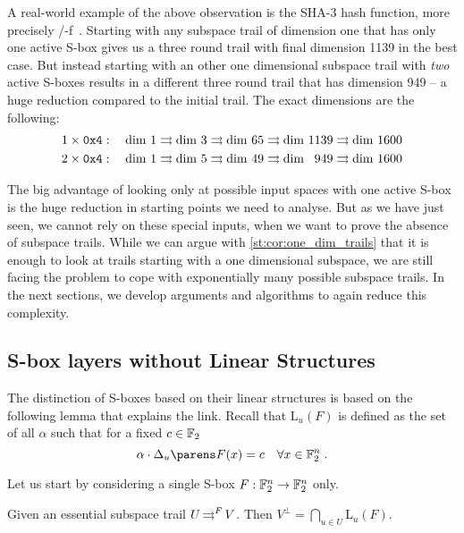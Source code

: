 \begin{example}
A real-world example of the above observation is the SHA-3 hash function, more precisely \keccak/-f~\cite{keccak,FIPS:SHA3}.
Starting with any subspace trail of dimension one that has only one active S-box gives us a three round trail with final dimension 1139 in the best case.
But instead starting with an other one dimensional subspace trail with \emph{two} active S-boxes results in a different three round trail that has dimension 949 -- a huge reduction compared to the initial trail.
The exact dimensions are the following:
\begin{align*}
    1\times \mathtt{0x4} &:\quad \mathrm{dim}\ 1 \rightrightarrows \mathrm{dim}\ 3 \rightrightarrows \mathrm{dim}\ 65 \rightrightarrows \mathrm{dim}\            1139 \rightrightarrows \mathrm{dim}\ 1600 \\
    2\times \mathtt{0x4} &:\quad \mathrm{dim}\ 1 \rightrightarrows \mathrm{dim}\ 5 \rightrightarrows \mathrm{dim}\ 49 \rightrightarrows \mathrm{dim}\ \hphantom{0}949 \rightrightarrows \mathrm{dim}\ 1600
\end{align*}
\end{example}

The big advantage of looking only at possible input spaces with one active S-box is the huge reduction in starting points we need to analyse.
But as we have just seen, we cannot rely on these special inputs, when we want to prove the absence of subspace trails.
While we can argue with \cref{st:cor:one_dim_trails} that it is enough to look at trails starting with a one dimensional subspace, we are still facing the problem to cope with exponentially many possible subspace trails.
In the next sections, we develop arguments and algorithms to again reduce this complexity.

\subsection{S-box layers without Linear Structures}\label{sec:st:algorithm1}

The distinction of S-boxes based on their linear structures is based on the following lemma that explains the link.
Recall that $\mathrm{L}_u(F)$ is defined as the set of all $\alpha$ such that for a fixed $ c \in \mathbb{F}_2$
\begin{equation*}
    \iprod{\alpha}{\derive{u}{F}(x)} = c \quad \forall x \in \F_2^n\;.
\end{equation*}

Let us start by considering a single S-box $F:\mathbb{F}_2^n \to \mathbb{F}_2^n$ only.
\begin{lemma}\label{st:lem:vperp_subtrail}
    Given an essential subspace trail $U \operatorname*{\rightrightarrows}^{F}_{} V$.
    Then $V^\perp = \displaystyle\bigcap_{u \in U} \mathrm{L}_{u}(F)$.
\end{lemma}

